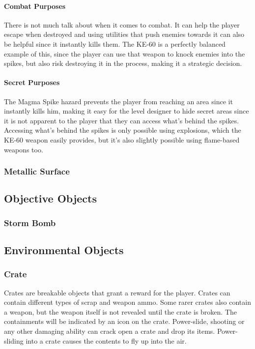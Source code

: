 \documentclass[12pt]{article}
\begin{document}
\paragraph{Combat Purposes}

There is not much talk about when it comes to combat. It can help the player escape when destroyed and using utilities that push enemies towards it can also be helpful since it instantly kills them. The KE-60 is a perfectly balanced example of this, since the player can use that weapon to knock enemies into the spikes, but also risk destroying it in the process, making it a strategic decision.

\paragraph{Secret Purposes}

The Magma Spike hazard prevents the player from reaching an area since it instantly kills him, making it easy for the level designer to hide secret areas since it is not apparent to the player that they can access what's behind the spikes. Accessing what's behind the spikes is only possible using explosions, which the KE-60 weapon easily provides, but it's also slightly possible using flame-based weapons too. 

\subsubsection{Metallic Surface}

\subsection{Objective Objects}

\subsubsection{Storm Bomb}

\subsection{Environmental Objects}

\subsubsection{Crate}

Crates are breakable objects that grant a reward for the player. Crates can contain different types of scrap and weapon ammo. Some rarer crates also contain a weapon, but the weapon itself is not revealed until the crate is broken. The containments will be indicated by an icon on the crate. Power-slide, shooting or any other damaging ability can crack open a crate and drop its items.  Power-sliding into a crate causes the contents to fly up into the air. 
\end{document}
